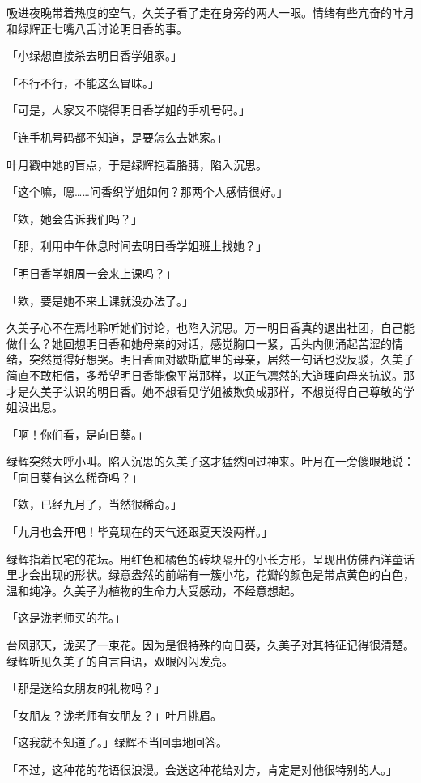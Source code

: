 \documentclass[UTF8]{ctexart}
\begin{document}
    吸进夜晚带着热度的空气，久美子看了走在身旁的两人一眼。情绪有些亢奋的叶月和绿辉正七嘴八舌讨论明日香的事。 

    「小绿想直接杀去明日香学姐家。」 

    「不行不行，不能这么冒昧。」 

    「可是，人家又不晓得明日香学姐的手机号码。」 

    「连手机号码都不知道，是要怎么去她家。」 

    叶月戳中她的盲点，于是绿辉抱着胳膊，陷入沉思。 

    「这个嘛，嗯……问香织学姐如何？那两个人感情很好。」 

    「欸，她会告诉我们吗？」 

    「那，利用中午休息时间去明日香学姐班上找她？」 

    「明日香学姐周一会来上课吗？」 

    「欸，要是她不来上课就没办法了。」 

    久美子心不在焉地聆听她们讨论，也陷入沉思。万一明日香真的退出社团，自己能做什么？她回想明日香和她母亲的对话，感觉胸口一紧，舌头内侧涌起苦涩的情绪，突然觉得好想哭。明日香面对歇斯底里的母亲，居然一句话也没反驳，久美子简直不敢相信，多希望明日香能像平常那样，以正气凛然的大道理向母亲抗议。那才是久美子认识的明日香。她不想看见学姐被欺负成那样，不想觉得自己尊敬的学姐没出息。 

    「啊！你们看，是向日葵。」 

    绿辉突然大呼小叫。陷入沉思的久美子这才猛然回过神来。叶月在一旁傻眼地说：「向日葵有这么稀奇吗？」 

    「欸，已经九月了，当然很稀奇。」 

    「九月也会开吧！毕竟现在的天气还跟夏天没两样。」 

    绿辉指着民宅的花坛。用红色和橘色的砖块隔开的小长方形，呈现出仿佛西洋童话里才会出现的形状。绿意盎然的前端有一簇小花，花瓣的颜色是带点黄色的白色，温和纯净。久美子为植物的生命力大受感动，不经意想起。 

    「这是泷老师买的花。」 

    台风那天，泷买了一束花。因为是很特殊的向日葵，久美子对其特征记得很清楚。绿辉听见久美子的自言自语，双眼闪闪发亮。 

    「那是送给女朋友的礼物吗？」 

    「女朋友？泷老师有女朋友？」叶月挑眉。 

    「这我就不知道了。」绿辉不当回事地回答。 

    「不过，这种花的花语很浪漫。会送这种花给对方，肯定是对他很特别的人。」 
\end{document}
